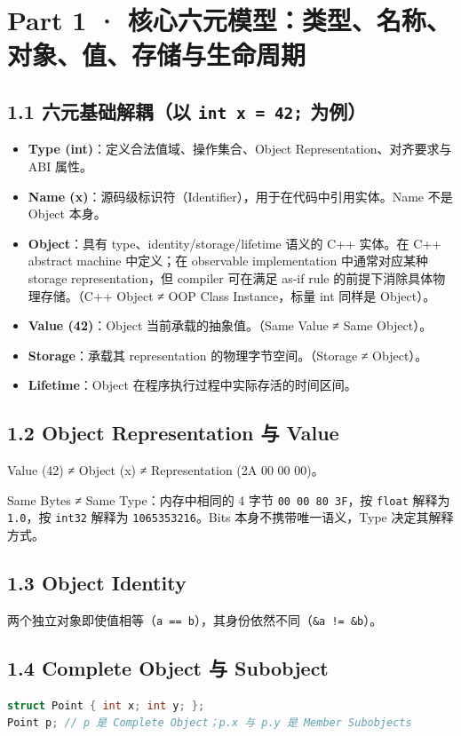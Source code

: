 \documentclass[11pt,a4paper]{article}
\begin{document}
\section{Part 1 · 核心六元模型：类型、名称、对象、值、存储与生命周期}
\subsection{1.1 六元基础解耦（以 \texttt{int x = 42;} 为例）}
\begin{itemize}
  \item \textbf{Type (int)}：定义合法值域、操作集合、Object Representation、对齐要求与 ABI 属性。
  \item \textbf{Name (x)}：源码级标识符（Identifier），用于在代码中引用实体。Name 不是 Object 本身。
  \item \textbf{Object}：具有 type、identity/storage/lifetime 语义的 C++ 实体。在 C++ abstract machine 中定义；在 observable implementation 中通常对应某种 storage representation，但 compiler 可在满足 as-if rule 的前提下消除具体物理存储。（C++ Object ≠ OOP Class Instance，标量 int 同样是 Object）。
  \item \textbf{Value (42)}：Object 当前承载的抽象值。（Same Value ≠ Same Object）。
  \item \textbf{Storage}：承载其 representation 的物理字节空间。（Storage ≠ Object）。
  \item \textbf{Lifetime}：Object 在程序执行过程中实际存活的时间区间。
\end{itemize}
\subsection{1.2 Object Representation 与 Value}
Value (42) ≠ Object (x) ≠ Representation (2A 00 00 00)。

Same Bytes ≠ Same Type：内存中相同的 4 字节 \texttt{00 00 80 3F}，按 \texttt{float} 解释为 \texttt{1.0}，按 \texttt{int32} 解释为 \texttt{1065353216}。Bits 本身不携带唯一语义，Type 决定其解释方式。

\subsection{1.3 Object Identity}
两个独立对象即使值相等（\texttt{a == b}），其身份依然不同（\texttt{\&a != \&b}）。

\subsection{1.4 Complete Object 与 Subobject}
\begin{lstlisting}[language=cpp]
struct Point { int x; int y; };
Point p; // p 是 Complete Object；p.x 与 p.y 是 Member Subobjects
\end{lstlisting}
\end{document}
